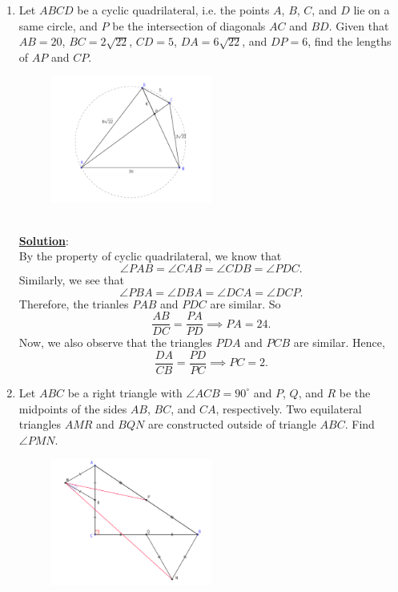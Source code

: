 \documentclass[a4paper]{article}
\begin{document}
\begin{enumerate}
		\newpage
	\item Let $ABCD$ be a cyclic quadrilateral, i.e. the points
		$A$, $B$, $C$, and $D$ lie on a same circle, and
		$P$ be the intersection of diagonals $AC$ and $BD$. 
		Given that $AB = 20$, $BC = 2\sqrt{22}$, $CD = 5$, 
		$DA = 6\sqrt{22}$, and $DP = 6$, find the lengths of 
		$AP$ and $CP$.
		\begin{figure}[htpb]
			\centering
			\includegraphics[width=0.5\textwidth]{test_prob2.png}
			\caption{}
			\label{fig:test_prob2-png}
		\end{figure}\\
		\underline{\textbf{Solution}}:\\
		By the property of cyclic quadrilateral, we know that
		\[
		\angle PAB = \angle CAB = \angle CDB = \angle PDC
		.\] 
		Similarly, we see that 
		\[
		\angle PBA = \angle DBA = \angle DCA = \angle DCP
		.\] 
		Therefore, the trianles $PAB$ and $PDC$ are similar. So
		\[
		\frac{AB}{DC} = \frac{PA}{PD} \implies PA = 24
		.\] 
		Now, we also observe that the triangles $PDA$ and $PCB$
		are similar. Hence,
		\[
		\frac{DA}{CB} = \frac{PD}{PC} \implies PC = 2
		.\] 
		\newpage
	\item Let $ABC$ be a right triangle with $\angle ACB = 90^\circ$
		and $P$, $Q$, and $R$ be the midpoints of the sides
		$AB$, $BC$, and $CA$, respectively. Two equilateral 
		triangles $AMR$ and $BQN$ are constructed outside
		of triangle $ABC$. Find $\angle PMN$.
		\begin{figure}[htpb]
			\centering
			\includegraphics[width=0.5\textwidth]{test_prob3.png}

\end{figure}
\end{enumerate}
\end{document}
